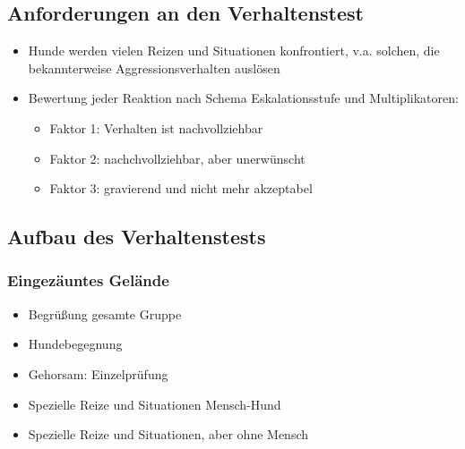     \subsection{Anforderungen an den Verhaltenstest}
        \begin{itemize}
            \item Hunde werden vielen Reizen und Situationen konfrontiert, v.a. solchen, die bekannterweise Aggressionsverhalten auslösen
            \item Bewertung jeder Reaktion nach Schema Eskalationsstufe und Multiplikatoren:
            \begin{itemize}
                \item Faktor 1: Verhalten ist nachvollziehbar
                \item Faktor 2: nachchvollziehbar, aber unerwünscht
                \item Faktor 3: gravierend und nicht mehr akzeptabel
            \end{itemize}
        \end{itemize}

    \subsection{Aufbau des Verhaltenstests}
        \subsubsection{Eingezäuntes Gelände}
            \begin{itemize}
                \item Begrüßung gesamte Gruppe
                \item Hundebegegnung
                \item Gehorsam: Einzelprüfung
                \item Spezielle Reize und Situationen Mensch-Hund
                \item Spezielle Reize und Situationen, aber ohne Mensch
            \end{itemize}
